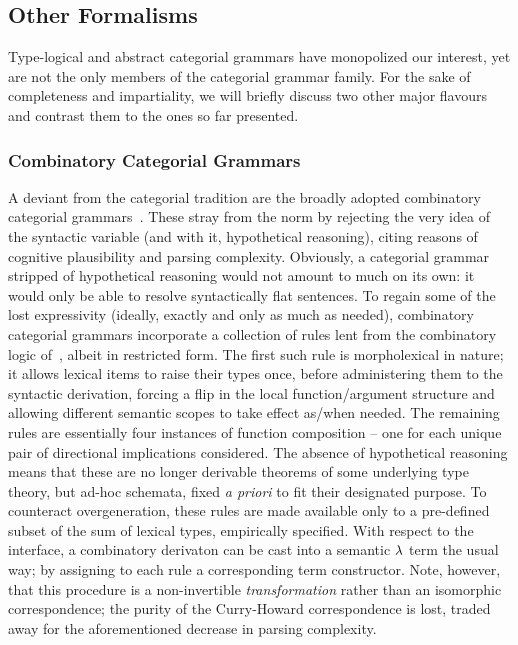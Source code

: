 \subsection{Other Formalisms}
Type-logical and abstract categorial grammars have monopolized our interest, yet are not the only members of the categorial grammar family.
For the sake of completeness and impartiality, we will briefly discuss two other major flavours and contrast them to the ones so far presented.

\subsubsection{Combinatory Categorial Grammars}
A deviant from the categorial tradition are the broadly adopted combinatory categorial grammars~\cite{ades1982order,szabolcsi1989bound, steedman2022combinatory}.
These stray from the norm by rejecting the very idea of the syntactic variable (and with it, hypothetical reasoning), citing reasons of cognitive plausibility and parsing complexity.
Obviously, a categorial grammar stripped of hypothetical reasoning would not amount to much on its own: it would only be able to resolve syntactically flat sentences.
To regain some of the lost expressivity (ideally, exactly and only as much as needed), combinatory categorial grammars incorporate a collection of rules lent from the combinatory logic of~\citet{curry1958combinatory}, albeit in restricted form.
The first such rule is morpholexical in nature; it allows lexical items to raise their types once, before administering them to the syntactic derivation, forcing a flip in the local function/argument structure and allowing different semantic scopes to take effect as/when needed.
The remaining rules are essentially four instances of function composition -- one for each unique pair of directional implications considered.
The absence of hypothetical reasoning means that these are no longer derivable theorems of some underlying type theory, but ad-hoc schemata, fixed \textit{a priori} to fit their designated purpose.
To counteract overgeneration, these rules are made available only to a pre-defined subset of the sum of lexical types, empirically specified.
With respect to the interface, a combinatory derivaton can be cast into a semantic $\mathnormal{\lambda}$ term the usual way; by assigning to each rule a corresponding term constructor.
Note, however, that this procedure is a non-invertible \textit{transformation} rather than an isomorphic correspondence; the purity of the Curry-Howard correspondence is lost, traded away for the aforementioned decrease in parsing complexity.

